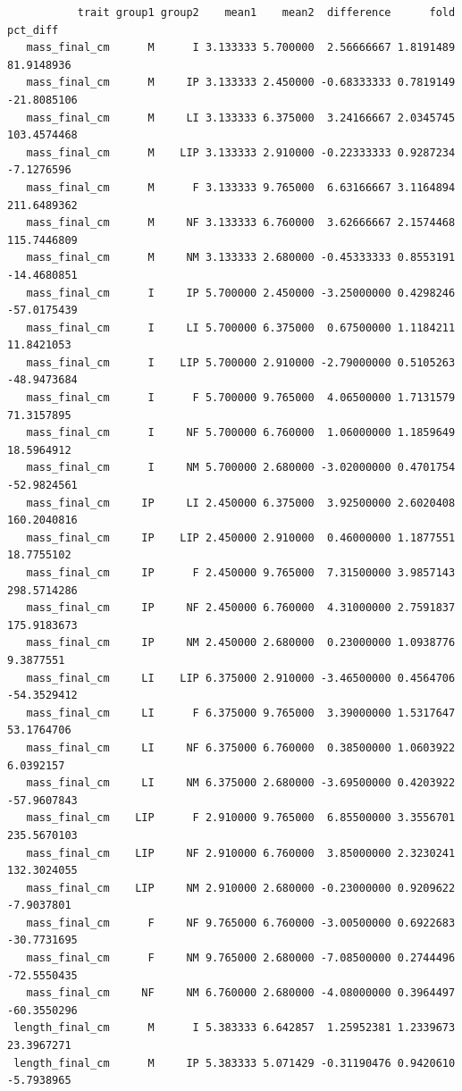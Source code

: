 \documentclass[
  landscape]{article}
\begin{document}
\begin{verbatim}
           trait group1 group2    mean1    mean2  difference      fold    pct_diff
   mass_final_cm      M      I 3.133333 5.700000  2.56666667 1.8191489  81.9148936
   mass_final_cm      M     IP 3.133333 2.450000 -0.68333333 0.7819149 -21.8085106
   mass_final_cm      M     LI 3.133333 6.375000  3.24166667 2.0345745 103.4574468
   mass_final_cm      M    LIP 3.133333 2.910000 -0.22333333 0.9287234  -7.1276596
   mass_final_cm      M      F 3.133333 9.765000  6.63166667 3.1164894 211.6489362
   mass_final_cm      M     NF 3.133333 6.760000  3.62666667 2.1574468 115.7446809
   mass_final_cm      M     NM 3.133333 2.680000 -0.45333333 0.8553191 -14.4680851
   mass_final_cm      I     IP 5.700000 2.450000 -3.25000000 0.4298246 -57.0175439
   mass_final_cm      I     LI 5.700000 6.375000  0.67500000 1.1184211  11.8421053
   mass_final_cm      I    LIP 5.700000 2.910000 -2.79000000 0.5105263 -48.9473684
   mass_final_cm      I      F 5.700000 9.765000  4.06500000 1.7131579  71.3157895
   mass_final_cm      I     NF 5.700000 6.760000  1.06000000 1.1859649  18.5964912
   mass_final_cm      I     NM 5.700000 2.680000 -3.02000000 0.4701754 -52.9824561
   mass_final_cm     IP     LI 2.450000 6.375000  3.92500000 2.6020408 160.2040816
   mass_final_cm     IP    LIP 2.450000 2.910000  0.46000000 1.1877551  18.7755102
   mass_final_cm     IP      F 2.450000 9.765000  7.31500000 3.9857143 298.5714286
   mass_final_cm     IP     NF 2.450000 6.760000  4.31000000 2.7591837 175.9183673
   mass_final_cm     IP     NM 2.450000 2.680000  0.23000000 1.0938776   9.3877551
   mass_final_cm     LI    LIP 6.375000 2.910000 -3.46500000 0.4564706 -54.3529412
   mass_final_cm     LI      F 6.375000 9.765000  3.39000000 1.5317647  53.1764706
   mass_final_cm     LI     NF 6.375000 6.760000  0.38500000 1.0603922   6.0392157
   mass_final_cm     LI     NM 6.375000 2.680000 -3.69500000 0.4203922 -57.9607843
   mass_final_cm    LIP      F 2.910000 9.765000  6.85500000 3.3556701 235.5670103
   mass_final_cm    LIP     NF 2.910000 6.760000  3.85000000 2.3230241 132.3024055
   mass_final_cm    LIP     NM 2.910000 2.680000 -0.23000000 0.9209622  -7.9037801
   mass_final_cm      F     NF 9.765000 6.760000 -3.00500000 0.6922683 -30.7731695
   mass_final_cm      F     NM 9.765000 2.680000 -7.08500000 0.2744496 -72.5550435
   mass_final_cm     NF     NM 6.760000 2.680000 -4.08000000 0.3964497 -60.3550296
 length_final_cm      M      I 5.383333 6.642857  1.25952381 1.2339673  23.3967271
 length_final_cm      M     IP 5.383333 5.071429 -0.31190476 0.9420610  -5.7938965

\end{verbatim}
\end{document}
